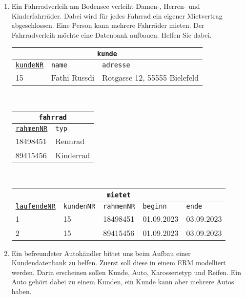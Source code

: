 \begin{Answer}[ref=TabelleErstellen1]
	\begin{enumerate}
		\item Ein Fahrradverleih am Bodensee verleiht Damen-, Herren- und Kinderfahrräder. Dabei wird für jedes Fahrrad ein eigener Mietvertrag abgeschlossen. Eine Person kann mehrere Fahrräder mieten. Der Fahrradverleih möchte eine Datenbank aufbauen. Helfen Sie dabei.\\
		\begin{tabular}{lll}
			\multicolumn{3}{c}{\lstinline!kunde!}\\
			\hline
			\underline{\lstinline!kundeNR!}&\lstinline!name!&\lstinline!adresse!\\
			\hline
			15&Fathi Russdi&Rotgasse 12, 55555 Bielefeld\\
		\end{tabular}\\
		\begin{tabular}{ll}
			\multicolumn{2}{c}{\lstinline!fahrrad!}\\
			\hline
			\underline{\lstinline!rahmenNR!}&\lstinline!typ!\\
			\hline
			18498451&Rennrad\\
			89415456&Kinderrad\\
		\end{tabular}\\
		\begin{tabular}{lllll}
			\multicolumn{5}{c}{\lstinline!mietet!}\\
			\hline
			\underline{\lstinline!laufendeNR!}&\lstinline!kundenNR!&\lstinline!rahmenNR!&\lstinline!beginn!&\lstinline!ende!\\
			\hline
			1&15&18498451&01.09.2023&03.09.2023\\
			2&15&89415456&01.09.2023&03.09.2023\\
		\end{tabular}

		\item Ein befreundeter Autohändler bittet uns beim Aufbau einer Kundendatenbank zu helfen. Zuerst soll diese in einem ERM modelliert werden. Darin erscheinen sollen Kunde, Auto, Karosserietyp und Reifen. Ein Auto gehört dabei zu einem Kunden, ein Kunde kann aber mehrere Autos haben.


\end{enumerate}
\end{Answer}
